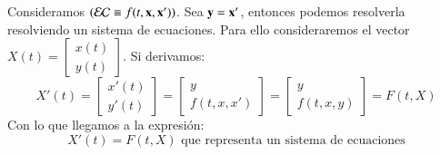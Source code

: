 \begin{eg}
    Consideramos $(\mathcal{EC} \equiv f(t, \mathbf{x}, \mathbf{x}'))$. Sea $\mathbf{y} = \mathbf{x'}$, entonces podemos resolverla resolviendo un sistema de ecuaciones. Para ello consideraremos el vector $X(t) = \left[\begin{smallmatrix} x(t) \\ y(t) \end{smallmatrix}\right]$. Si derivamos:
    $$
        X'(t) = \left[\begin{matrix} x'(t) \\ y'(t) \end{matrix}\right] = \left[\begin{matrix} y \\ f(t, x, x') \end{matrix}\right]= \left[\begin{matrix} y \\ f(t, x, y) \end{matrix}\right] = F(t, X)
    $$
    Con lo que llegamos a la expresión:
    $$
        X'(t) = F(t, X) \text{ que representa un sistema de ecuaciones}
    $$

\end{eg}

